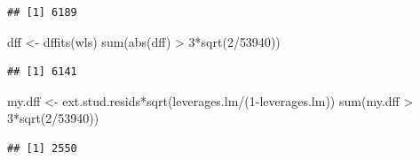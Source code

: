 \documentclass[
]{book}
\newenvironment{Shaded}{\begin{snugshade}}{\end{snugshade}}
\newcommand{\AttributeTok}[1]{\textcolor[rgb]{0.77,0.63,0.00}{#1}}
\newcommand{\DecValTok}[1]{\textcolor[rgb]{0.00,0.00,0.81}{#1}}
\newcommand{\FunctionTok}[1]{\textcolor[rgb]{0.00,0.00,0.00}{#1}}
\newcommand{\NormalTok}[1]{#1}
\newcommand{\OtherTok}[1]{\textcolor[rgb]{0.56,0.35,0.01}{#1}}
\newcommand{\SpecialCharTok}[1]{\textcolor[rgb]{0.00,0.00,0.00}{#1}}
\newcommand{\StringTok}[1]{\textcolor[rgb]{0.31,0.60,0.02}{#1}}
\begin{document}
\begin{verbatim}
## [1] 6189
\end{verbatim}

\begin{Shaded}
\begin{Highlighting}[]
\NormalTok{dff }\OtherTok{\textless{}{-}} \FunctionTok{dffits}\NormalTok{(wls)}
\FunctionTok{sum}\NormalTok{(}\FunctionTok{abs}\NormalTok{(dff) }\SpecialCharTok{\textgreater{}} \DecValTok{3}\SpecialCharTok{*}\FunctionTok{sqrt}\NormalTok{(}\DecValTok{2}\SpecialCharTok{/}\DecValTok{53940}\NormalTok{))}
\end{Highlighting}
\end{Shaded}

\begin{verbatim}
## [1] 6141
\end{verbatim}

\begin{Shaded}
\begin{Highlighting}[]
\NormalTok{my.dff }\OtherTok{\textless{}{-}}\NormalTok{ ext.stud.resids}\SpecialCharTok{*}\FunctionTok{sqrt}\NormalTok{(leverages.lm}\SpecialCharTok{/}\NormalTok{(}\DecValTok{1}\SpecialCharTok{{-}}\NormalTok{leverages.lm))}
\FunctionTok{sum}\NormalTok{(my.dff }\SpecialCharTok{\textgreater{}} \DecValTok{3}\SpecialCharTok{*}\FunctionTok{sqrt}\NormalTok{(}\DecValTok{2}\SpecialCharTok{/}\DecValTok{53940}\NormalTok{))}
\end{Highlighting}
\end{Shaded}

\begin{verbatim}
## [1] 2550
\end{verbatim}

\begin{Shaded}
\end{Shaded}
\end{document}

